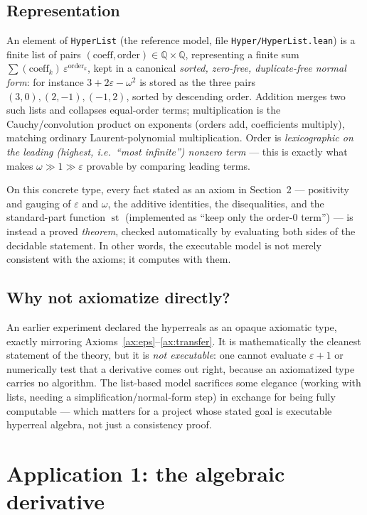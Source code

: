 \documentclass[11pt]{article}
\theoremstyle{definition}
\theoremstyle{remark}
\newcommand{\Q}{\mathbb{Q}}
\newcommand{\eps}{\varepsilon}
\newcommand{\st}{\operatorname{st}}
\begin{document}
\subsection{Representation}

An element of \texttt{HyperList} (the reference model, file
\texttt{Hyper/HyperList.lean}) is a finite list of pairs
$(\text{coeff}, \text{order}) \in \Q \times \Q$, representing a finite sum
$\sum (\text{coeff}_k)\,\eps^{\text{order}_k}$, kept in a canonical
\emph{sorted, zero-free, duplicate-free normal form}: for instance
$3 + 2\eps - \omega^2$ is stored as the three pairs $(3,0), (2,-1),
(-1,2)$, sorted by descending order. Addition merges two such lists and
collapses equal-order terms; multiplication is the Cauchy/convolution
product on exponents (orders add, coefficients multiply), matching
ordinary Laurent-polynomial multiplication. Order is \emph{lexicographic
on the leading (highest, i.e.\ ``most infinite'') nonzero term} — this is
exactly what makes $\omega \gg 1 \gg \eps$ provable by comparing leading
terms.

On this concrete type, every fact stated as an axiom in
Section~2 — positivity and gauging of $\eps$ and $\omega$, the additive
identities, the disequalities, and the standard-part function
$\st$ (implemented as ``keep only the order-$0$ term'') — is instead a
proved \emph{theorem}, checked automatically by evaluating both sides of
the decidable statement. In other words, the executable model is not
merely consistent with the axioms; it computes with them.

\subsection{Why not axiomatize directly?}

An earlier experiment declared the hyperreals as an opaque axiomatic
type, exactly mirroring Axioms~\ref{ax:eps}--\ref{ax:transfer}. It is
mathematically the cleanest statement of the theory, but it is \emph{not
executable}: one cannot evaluate $\eps+1$ or numerically test that a
derivative comes out right, because an axiomatized type carries no
algorithm. The list-based model sacrifices some elegance (working with
lists, needing a simplification/normal-form step) in exchange for being
fully computable — which matters for a project whose stated goal is
executable hyperreal algebra, not just a consistency proof.

\section{Application 1: the algebraic derivative}
\end{document}
